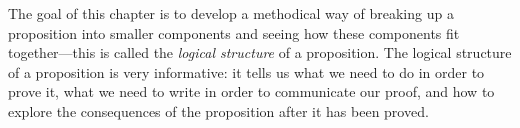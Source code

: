 The goal of this chapter is to develop a methodical way of breaking up a proposition into smaller components and seeing how these components fit together---this is called the \textit{logical structure} of a proposition. The logical structure of a proposition is very informative: it tells us what we need to do in order to prove it, what we need to write in order to communicate our proof, and how to explore the consequences of the proposition after it has been proved.

\begin{center} \vspace{-15pt}
\end{center}

%

